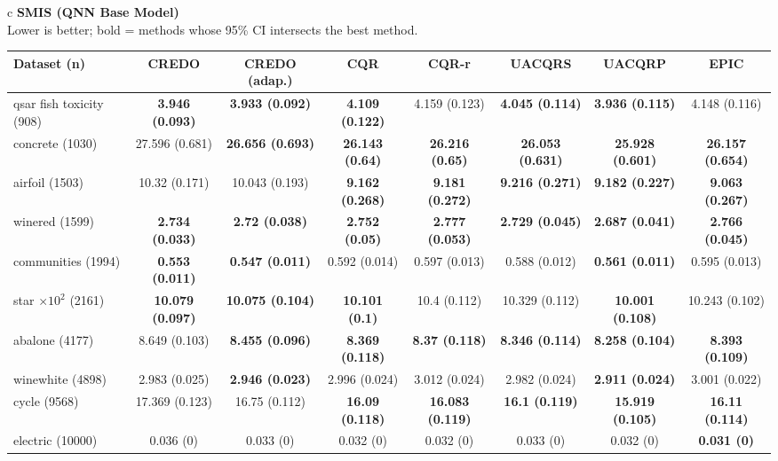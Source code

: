 \documentclass[border=6pt]{standalone}
\begin{document}
\begin{adjustbox}{max width=\linewidth}
\begin{tabular}{c}
{\small\textbf{SMIS (QNN Base Model)}}\\[-1pt]
{\scriptsize Lower is better; bold = methods whose 95\% CI intersects the best method.}\\[2pt]
\scriptsize\begin{tabular}{lccccccc}
\hline
Dataset (n) & \textbf{CREDO} & \textbf{CREDO (adap.)} & \textbf{CQR} & \textbf{CQR-r} & \textbf{UACQRS} & \textbf{UACQRP} & \textbf{EPIC}\\ \hline
qsar fish toxicity (908) & \textbf{3.946 (0.093)} & \textbf{3.933 (0.092)} & \textbf{4.109 (0.122)} & 4.159 (0.123) & \textbf{4.045 (0.114)} & \textbf{3.936 (0.115)} & 4.148 (0.116)\\
concrete (1030) & 27.596 (0.681) & \textbf{26.656 (0.693)} & \textbf{26.143 (0.64)} & \textbf{26.216 (0.65)} & \textbf{26.053 (0.631)} & \textbf{25.928 (0.601)} & \textbf{26.157 (0.654)}\\
airfoil (1503) & 10.32 (0.171) & 10.043 (0.193) & \textbf{9.162 (0.268)} & \textbf{9.181 (0.272)} & \textbf{9.216 (0.271)} & \textbf{9.182 (0.227)} & \textbf{9.063 (0.267)}\\
winered (1599) & \textbf{2.734 (0.033)} & \textbf{2.72 (0.038)} & \textbf{2.752 (0.05)} & \textbf{2.777 (0.053)} & \textbf{2.729 (0.045)} & \textbf{2.687 (0.041)} & \textbf{2.766 (0.045)}\\
communities (1994) & \textbf{0.553 (0.011)} & \textbf{0.547 (0.011)} & 0.592 (0.014) & 0.597 (0.013) & 0.588 (0.012) & \textbf{0.561 (0.011)} & 0.595 (0.013)\\
star $\times 10^2$ (2161) & \textbf{10.079 (0.097)} & \textbf{10.075 (0.104)} & \textbf{10.101 (0.1)} & 10.4 (0.112) & 10.329 (0.112) & \textbf{10.001 (0.108)} & 10.243 (0.102)\\
abalone (4177) & 8.649 (0.103) & \textbf{8.455 (0.096)} & \textbf{8.369 (0.118)} & \textbf{8.37 (0.118)} & \textbf{8.346 (0.114)} & \textbf{8.258 (0.104)} & \textbf{8.393 (0.109)}\\
winewhite (4898) & 2.983 (0.025) & \textbf{2.946 (0.023)} & 2.996 (0.024) & 3.012 (0.024) & 2.982 (0.024) & \textbf{2.911 (0.024)} & 3.001 (0.022)\\
cycle (9568) & 17.369 (0.123) & 16.75 (0.112) & \textbf{16.09 (0.118)} & \textbf{16.083 (0.119)} & \textbf{16.1 (0.119)} & \textbf{15.919 (0.105)} & \textbf{16.11 (0.114)}\\
electric (10000) & 0.036 (0) & 0.033 (0) & 0.032 (0) & 0.032 (0) & 0.033 (0) & 0.032 (0) & \textbf{0.031 (0)}\\

\end{tabular}
\end{tabular}
\end{adjustbox}
\end{document}
